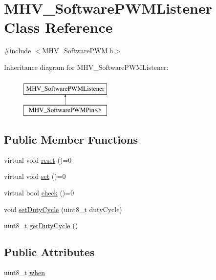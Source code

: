 \hypertarget{class_m_h_v___software_p_w_m_listener}{\section{M\-H\-V\-\_\-\-Software\-P\-W\-M\-Listener Class Reference}
\label{class_m_h_v___software_p_w_m_listener}
}


{\ttfamily \#include $<$M\-H\-V\-\_\-\-Software\-P\-W\-M.\-h$>$}

Inheritance diagram for M\-H\-V\-\_\-\-Software\-P\-W\-M\-Listener\-:\begin{figure}[H]
\begin{center}
\leavevmode
\includegraphics[height=2.000000cm]{class_m_h_v___software_p_w_m_listener}
\end{center}
\end{figure}
\subsection*{Public Member Functions}
\begin{DoxyCompactItemize}
\item 
virtual void \hyperlink{class_m_h_v___software_p_w_m_listener_aa7b9a7ccf218ef0f07943d5867bcdd40}{reset} ()=0
\item 
virtual void \hyperlink{class_m_h_v___software_p_w_m_listener_a8aab80a3527516e82a6019a0574f30b2}{set} ()=0
\item 
virtual bool \hyperlink{class_m_h_v___software_p_w_m_listener_ab38928f4fef63d516046f492e9ef9b01}{check} ()=0
\item 
void \hyperlink{class_m_h_v___software_p_w_m_listener_aa9b9e22df8ac38895a05c09f4b15f0ae}{set\-Duty\-Cycle} (uint8\-\_\-t duty\-Cycle)
\item 
uint8\-\_\-t \hyperlink{class_m_h_v___software_p_w_m_listener_abb19231133f34d33dfcc1c9597f67c6d}{get\-Duty\-Cycle} ()
\end{DoxyCompactItemize}
\subsection*{Public Attributes}
\begin{DoxyCompactItemize}
\item 
uint8\-\_\-t \hyperlink{class_m_h_v___software_p_w_m_listener_ab3f5e55e2768e82057462c6af8514904}{when}
\end{DoxyCompactItemize}


